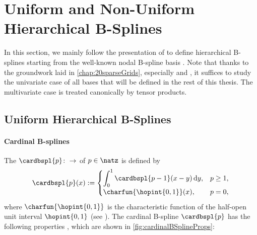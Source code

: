 \section{Uniform and Non-Uniform Hierarchical B-Splines}
\label{sec:31standardBSplines}


\noindent
In this section, we mainly follow the presentation of
to define hierarchical B-splines
starting from the well-known nodal B-spline basis
.
Note that thanks to the groundwork laid in \cref{chap:20sparseGrids},
especially  and
,
it suffices to study the univariate case
of all bases that will be defined in the rest of this thesis.
The multivariate case is treated canonically by tensor products.



\subsection{Uniform Hierarchical B-Splines}
\label{sec:311uniform}

\paragraph{Cardinal B-splines}

The 
$\cardbspl{p}\colon \real \to \real$ of  $p \in \natz$
is defined by
\begin{equation}
  \label{eq:cardinalBSpline}
  \cardbspl{p}(x)
  :=
  \begin{cases}
    \displaystyle\int_0^1 \cardbspl{p-1}(x - y) \diff{}y,&p \ge 1,\\
    \charfun{\hopint{0, 1}}(x),&p = 0,
  \end{cases}
\end{equation}
where $\charfun{\hopint{0, 1}}$ is the characteristic function of
the half-open unit interval $\hopint{0, 1}$
(see \cite{Hoellig13Approximation}).
The cardinal B-spline $\cardbspl{p}$ has the following properties
\cite{Hoellig03Finite},
which are shown in \cref{fig:cardinalBSplineProps}:

